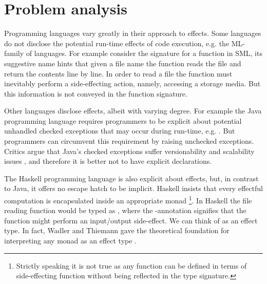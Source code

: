 \section{Problem analysis}

Programming languages vary greatly in their approach to effects.
Some languages do not disclose the potential run-time effects of code execution, e.g. the ML-family of languages. For example consider the signature  for a function in SML, its suggestive name hints that given a file name the function reads the file and return the contents line by line. In order to read a file the function must inevitably perform a side-effecting action, namely, accessing a storage media. But this information is not conveyed in the function signature.

Other languages disclose effects, albeit with varying degree. For example the Java programming language requires programmers to be explicit about potential unhandled checked exceptions that may occur during run-time, e.g. . But programmers can circumvent this requirement by raising unchecked exceptions. Critics argue that Java's checked exceptions suffer versionability and scalability issues \cite{Venners03}, and therefore it is better not to have explicit  declarations.

The Haskell programming language is also explicit about effects, but, in contrast to Java, it offers no escape hatch to be implicit. Haskell insists that every effectful computation is encapsulated inside an appropriate monad \footnote{Strictly speaking it is not true as any function can be defined in terms of side-effecting  function without being reflected in the type signature.}. In Haskell the file reading function would be typed as , where the -annotation signifies that the function might perform an input/output side-effect. We can think of  as an effect type. In fact, Wadler and Thiemann gave the theoretical foundation for interpreting any monad as an effect type \cite{Wadler2003}. %

